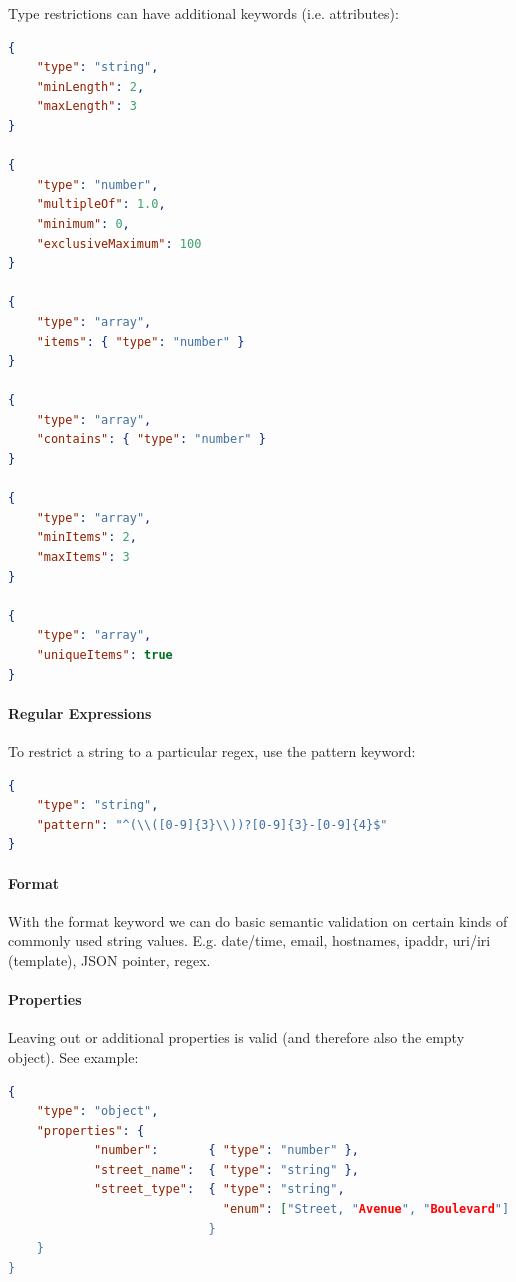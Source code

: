 Type restrictions can have additional keywords (i.e. attributes):
\begin{lstlisting}[language=json,firstnumber=1]
{ 
    "type": "string",
    "minLength": 2,
    "maxLength": 3
}

{ 
    "type": "number",
    "multipleOf": 1.0,
    "minimum": 0,
    "exclusiveMaximum": 100
}

{ 
    "type": "array",
    "items": { "type": "number" }
}

{ 
    "type": "array",
    "contains": { "type": "number" }
}

{ 
    "type": "array",
    "minItems": 2,
    "maxItems": 3
}

{ 
    "type": "array",
    "uniqueItems": true
}
\end{lstlisting}


\paragraph{Regular Expressions}
To restrict a string to a particular regex, use the pattern keyword: %
\begin{lstlisting}[language=json,firstnumber=1]
{ 
    "type": "string",
    "pattern": "^(\\([0-9]{3}\\))?[0-9]{3}-[0-9]{4}$"
}
\end{lstlisting}

\paragraph{Format}
With the format keyword we can do basic semantic validation on certain kinds of commonly used string values. E.g. date/time, email, hostnames, ipaddr, uri/iri (template), JSON pointer, regex. %

\paragraph{Properties}
Leaving out or additional properties is valid (and therefore also the empty object). See example:
\begin{lstlisting}[language=json,firstnumber=1]
{ 
    "type": "object",
    "properties": {
            "number":       { "type": "number" },
            "street_name":  { "type": "string" },
            "street_type":  { "type": "string",
                              "enum": ["Street, "Avenue", "Boulevard"]
                            }
    }
}
\end{lstlisting}

